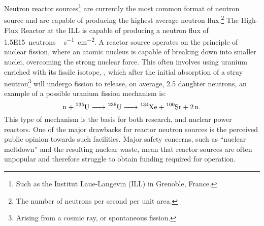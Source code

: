 Neutron reactor sources\footnote{Such as the Institut Laue-Langevin (ILL) in Grenoble, France.} are currently the most common format of neutron source and are capable of producing the highest average neutron flux.\footnote{The number of neutrons per second per unit area.}
The High-Flux Reactor at the ILL is capable of producing a neutron flux of \SI{1.5E15}{neutrons\,\second^{-1}\centi\meter^{-2}}.\autocite{noauthor_ill_nodate}
A reactor source operates on the principle of nuclear fission, where an atomic nucleus is capable of breaking down into smaller nuclei, overcoming the strong nuclear force. This often involves using uranium enriched with its fissile isotope, , which after the initial absorption of a stray neutron\footnote{Arising from a cosmic ray, or spontaneous fission.} will undergo fission to release, on average, 2.5 daughter neutrons, an example of a possible uranium fission mechanism is:
%
\begin{equation*}
    \ce{n + ^{235}U -> ^{236}U -> ^{134}Xe + ^{100}Sr + 2n}.
\end{equation*}
%
This type of mechanism is the basis for both research, and nuclear power reactors.\autocite{sivia_elementary_2011}
One of the major drawbacks for reactor neutron sources is the perceived public opinion towards such facilities.
Major safety concerns, such as ``nuclear meltdown'' and the resulting nuclear waste, mean that reactor sources are often unpopular and therefore struggle to obtain funding required for operation.

